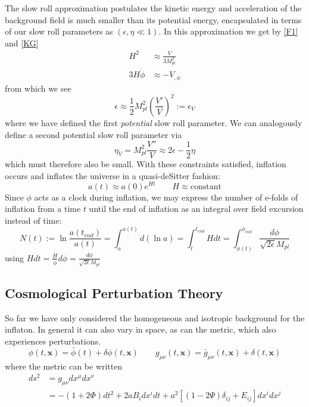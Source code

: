 \documentclass[a4paper,10pt]{article}
\renewcommand{\v}[1]{\mathbf{#1}}
\newcommand{\Mp}{M_{pl}}
\newcommand{\half}{\frac{1}{2}}
\newcommand{\bphi}{\bar{\phi}}
\begin{document}
The slow roll approximation postulates the kinetic energy and acceleration of the background field is much smaller than its potential energy, encapsulated in terms of our slow roll parameters as $(\epsilon, \eta \ll 1)$. In this approximation we get by \ref{F1} and \ref{KG} 
\begin{equation}\begin{split}
H^2 &\approx \frac{V}{3\Mp^2} \\
3H\dot{\phi} &\approx -V_{,\phi}
\end{split}\end{equation}
from which we see 
\begin{equation}
\epsilon \approx \half\Mp^2 (\frac{V'}{V})^2 := \epsilon_V
\end{equation}
where we have defined the first \textit{potential} slow roll parameter. We can analogously define a second potential slow roll parameter via
\begin{equation}
\eta_V = \Mp^2 \frac{V''}{V} \approx 2\epsilon - \half\eta
\end{equation}
which must therefore also be small. With these constraints satisfied, inflation occurs and inflates the universe in a quasi-deSitter fashion:
\begin{equation}
a(t) \approx a(0)e^{Ht} \qquad H\approx\text{constant}
\end{equation} 
Since $\phi$ acts as a clock during inflation, we may express the number of e-folds of inflation from a time $t$ until the end of inflation as an integral over field excursion instead of time:
\begin{equation}
N(t) := \ln{\frac{a(t_{end})}{a(t)}} = \int_a^{a(t)} d(\ln{a}) = \int_t^{t_{end}} Hdt = \int_{\phi(t)}^{\phi_{end}} \frac{d\phi}{\sqrt{2\epsilon}\Mp}
\label{efolds}
\end{equation}
using $Hdt=\frac{H}{\dot{\phi}}d\phi=\frac{d\phi}{\sqrt{2\epsilon}\Mp}$


\subsection{Cosmological Perturbation Theory}
So far we have only considered the homogeneous and isotropic background for the inflaton. In general it can also vary in space, as can the metric, which also experiences perturbations.
\begin{equation}
\phi(t,\v{x}) = \bphi(t) +\delta\phi(t,\v{x}) \qquad g_{\mu\nu}(t,\v{x}) = \bar{g}_{\mu\nu}(t,\v{x}) +\delta (t,\v{x})
\end{equation}
where the metric can be written
\begin{equation}
\begin{split}
ds^2 &= g_{\mu\nu}dx^\mu dx^\nu\\
&= -(1+2\Phi)dt^2 + 2aB_idx^idt+a^2[(1-2\Psi)\delta_{ij}+E_{ij}]dx^idx^j
\end{split}
\end{equation}
\end{document}
